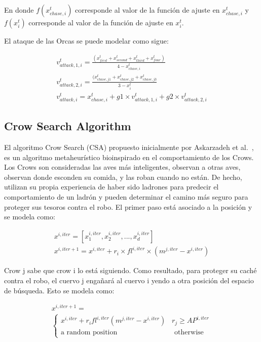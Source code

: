 \documentclass[conference]{IEEEtran}
\begin{document}
\noindent En donde $f(x_{chase,i}^t)$ corresponde al valor de la función de ajuste en $x_{chase,i}^t$ y $f(x_{i}^t )$ corresponde al valor de la función de ajuste en $x_{i}^t$.

El ataque de las Orcas se puede modelar como sigue:

\begin{equation}
\begin{gathered}
v_{attack,1,i}^t = \frac{(x_{first}^t+x_{second}^t + x_{third}^t + x_{four}^t)}{4-x_{chase,i}^t} \\
v_{attack,2,i}^t = \frac{(x_{chase,j1}^t+x_{chase,j2}^t + x_{chase,j3}^t}{3-x_{i}^t}  \\
v_{attack,i}^t = x_{chase,i}^t+ g1 \times v_{attack,1,i}^t + g2 \times v_{attack,2,i}^t
\end{gathered}
\label{eq22}
\end{equation}

\subsection{Crow Search Algorithm}

\noindent El algoritmo Crow Search (CSA) propuesto inicialmente por Askarzadeh et al.~\cite{Askarzadeh2016}, es un algoritmo metaheurístico bioinspirado en el comportamiento de los Crows. Los Crows son consideradas las aves más inteligentes, observan a otras aves, observan donde esconden su comida, y las roban cuando no están. De hecho, utilizan su propia experiencia de haber sido ladrones para predecir el comportamiento de un ladrón y pueden determinar el camino más seguro para proteger sus tesoros contra el robo. El primer paso está asociado a la posición y se modela como:

\begin{equation}
\begin{gathered}
x^{i,iter} = [x_{1}^{i,iter}, x_{2}^{i,iter},...,x_{d}^{i,iter}]\\
x^{i,iter+1}=x^{i,iter}+r_{i} \times fl^{i,iter} \times (m^{j,iter}-x^{i,iter})
\end{gathered}
\label{eq23}
\end{equation}

\noindent Crow j sabe que crow i lo está siguiendo. Como resultado, para proteger su caché contra el robo, el cuervo j engañará al cuervo i yendo a otra posición del espacio de búsqueda. Esto se modela como:

\begin{equation}
\begin{gathered}
x^{i,iter+1}=\\
\begin{cases}
x^{i,iter}+r_{i} fl^{i,iter} (m^{j,iter} - x^{i,iter}) \; \; \; r_j \geq AP^{i,iter}\\
\text{a random position} \; \; \; \; \; \;\; \; \;\; \; \;\;\; \; \;\;\; \; \; \; \;\;\; \; \;\; \; \;  \text{otherwise}
\end{cases}
\end{gathered}
\label{eq24}
\end{equation}
\end{document}
